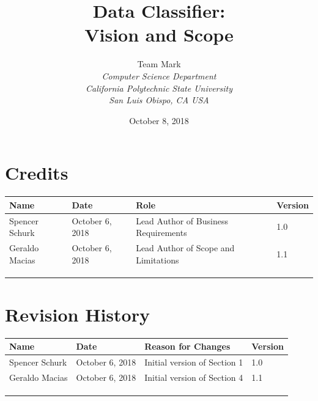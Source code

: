 \documentclass[12pt,oneside,letterpaper]{article}
\begin{document}
\title{\bfseries Data Classifier: \\Vision and Scope}

\author {
\large{Team Mark}\\
\emph{Computer Science Department}\\
\emph{California Polytechnic State University}\\
\emph{San Luis Obispo, CA USA}\\
}

\date{October 8, 2018}
\maketitle \thispagestyle{empty}

\pagebreak
\tableofcontents


\section*{Credits}
\begin{tabular}{|l|l|p{2in}|l|}
\hline
\textbf{Name}&\textbf{Date}&\textbf{Role}&\textbf{Version}\\
\hline
Spencer Schurk&October 6, 2018&Lead Author of Business Requirements&1.0\\
\hline
Geraldo Macias&October 6, 2018&Lead Author of Scope and Limitations&1.1\\
\hline
&&&\\
\hline
&&&\\
\hline
&&&\\
\hline
\end{tabular}


\section*{Revision History}
\begin{tabular}{|l|l|p{2in}|l|}
\hline
\textbf{Name}&\textbf{Date}&\textbf{Reason for Changes}&\textbf{Version}\\
\hline
Spencer Schurk&October 6, 2018&Initial version of Section 1&1.0\\
\hline
Geraldo Macias&October 6, 2018&Initial version of Section 4&1.1\\
\hline
&&&\\
\hline
&&&\\
\hline
&&&\\
\hline
\end{tabular}
\end{document}
